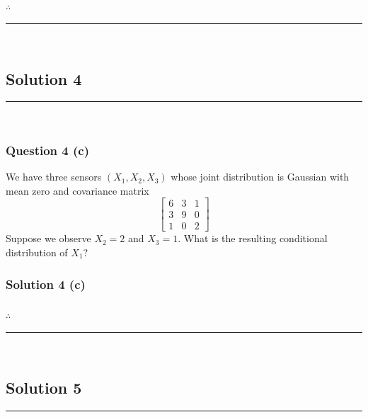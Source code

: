 \documentclass{article}
\begin{document}
\subsubsection*{\normalfont}{$\therefore$ }

\noindent\rule{\textwidth}{0.4pt}\\

\newpage

\subsection*{Solution 4}
\noindent\rule{\textwidth}{0.4pt}\\
\subsubsection*{Question 4 (c)}
\begin{flushleft}
    We have three sensors $(X_1, X_2, X_3)$ whose joint distribution is Gaussian with mean zero and covariance matrix 
    \[
    \begin{bmatrix}
    6 & 3 & 1 \\
    3 & 9 & 0 \\
    1 & 0 & 2
    \end{bmatrix}
    \]
    Suppose we observe $X_2=2$ and $X_3=1$. 
    What is the resulting conditional distribution of $X_1$? 
\end{flushleft}

\subsubsection*{Solution 4 (c)}


\subsubsection*{\normalfont}{$\therefore$ }

\noindent\rule{\textwidth}{0.4pt}\\

\newpage

\subsection*{Solution 5}
\noindent\rule{\textwidth}{0.4pt}\\
\end{document}
